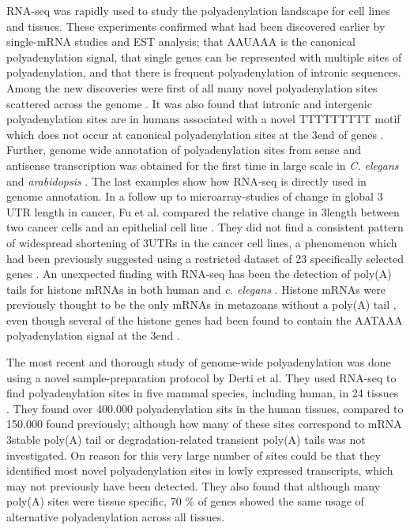 RNA-seq was rapidly used to study the polyadenylation landscape for cell lines
and tissues. These experiments confirmed what had been discovered earlier by
single-mRNA studies and EST analysis; that AAUAAA is the canonical
polyadenylation signal, that single genes can be represented with multiple
sites of polyadenylation, and that there is frequent polyadenylation of
intronic sequences. Among the new discoveries were first of all many novel
polyadenylation sites scattered across the genome
\cite{ozsolak_comprehensive_2010, derti_quantitative_2012}. It was also found
that intronic and intergenic polyadenylation sites are in humans associated
with a novel TTTTTTTTT motif which does not occur at canonical polyadenylation
sites at the 3\p end of genes \cite{ozsolak_comprehensive_2010}. Further,
genome wide annotation of polyadenylation sites from sense and antisense
transcription was obtained for the first time in large scale in \textit{C.
elegans} and \textit{arabidopsis} \cite{mangone_landscape_2010,
wu_genome-wide_2011}. The last examples show how RNA-seq is directly used in
genome annotation. In a follow up to microarray-studies of change in global 3\p
UTR length in cancer, Fu et al. compared the relative change in 3\p length
between two cancer cells and an epithelial cell line
\cite{fu_differential_2011}. They did not find a consistent pattern of
widespread shortening of 3\p UTRs in the cancer cell lines, a phenomenon which
had been previously suggested using a restricted dataset of 23 specifically
selected genes \cite{mayr_widespread_2009-2}. An unexpected finding with
RNA-seq has been the detection of poly(A) tails for histone mRNAs in both human
and \textit{c.  elegans} \cite{mangone_landscape_2010-1, shepard_complex_2011}.
Histone mRNAs were previously thought to be the only mRNAs in metazoans without
a poly(A) tail \cite{marzluff_metabolism_2008}, even though several of the
histone genes had been found to contain the AATAAA polyadenylation signal at
the 3\p end \cite{keall_histone_2007}.

The most recent and thorough study of genome-wide polyadenylation was done
using a novel sample-preparation protocol by Derti et al. They used RNA-seq to
find polyadenylation sites in five mammal species, including human, in 24
tissues \cite{derti_quantitative_2012}. They found over 400.000 polyadenylation
sits in the human tissues, compared to 150.000 found previously; although how
many of these sites correspond to mRNA 3\p stable poly(A) tail or
degradation-related transient poly(A) tails was not investigated. On reason for
this very large number of sites could be that they identified most novel
polyadenylation sites in lowly expressed transcripts, which may not previously
have been detected. They also found that although many poly(A) sites were
tissue specific, 70 \% of genes showed the same usage of alternative
polyadenylation across all tissues.

